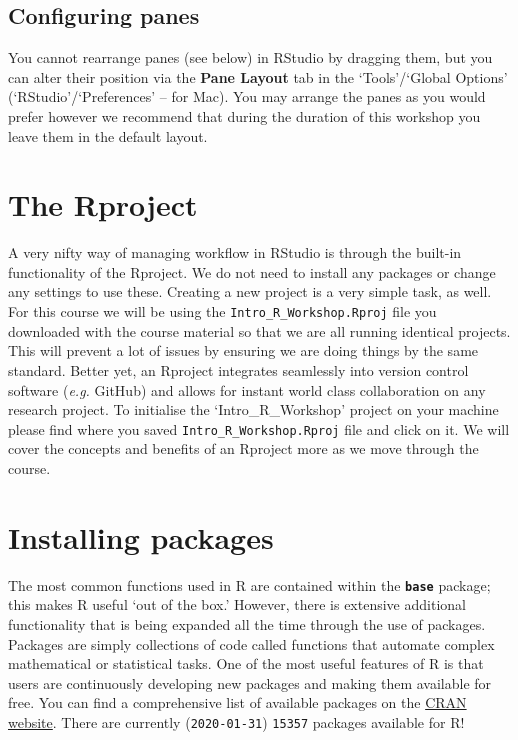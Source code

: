\documentclass[
]{book}
\begin{document}
\hypertarget{configuring-panes}{%
\subsection{Configuring panes}\label{configuring-panes}}

You cannot rearrange panes (see below) in RStudio by dragging them, but you can alter their position via the \textbf{Pane Layout} tab in the `Tools'/`Global Options' (`RStudio'/`Preferences' -- for Mac). You may arrange the panes as you would prefer however we recommend that during the duration of this workshop you leave them in the default layout.

\hypertarget{the-rproject}{%
\section{The Rproject}\label{the-rproject}}

A very nifty way of managing workflow in RStudio is through the built-in functionality of the Rproject. We do not need to install any packages or change any settings to use these. Creating a new project is a very simple task, as well. For this course we will be using the \texttt{Intro\_R\_Workshop.Rproj} file you downloaded with the course material so that we are all running identical projects. This will prevent a lot of issues by ensuring we are doing things by the same standard. Better yet, an Rproject integrates seamlessly into version control software (\emph{e.g.} GitHub) and allows for instant world class collaboration on any research project. To initialise the `Intro\_R\_Workshop' project on your machine please find where you saved \texttt{Intro\_R\_Workshop.Rproj} file and click on it. We will cover the concepts and benefits of an Rproject more as we move through the course.

\hypertarget{installing-packages}{%
\section{Installing packages}\label{installing-packages}}

The most common functions used in R are contained within the \textbf{\texttt{base}} package; this makes R useful `out of the box.' However, there is extensive additional functionality that is being expanded all the time through the use of packages. Packages are simply collections of code called functions that automate complex mathematical or statistical tasks. One of the most useful features of R is that users are continuously developing new packages and making them available for free. You can find a comprehensive list of available packages on the \href{https://cran.r-project.org/web/packages/}{CRAN website}. There are currently (\texttt{2020-01-31}) \texttt{15357} packages available for R!
\end{document}
